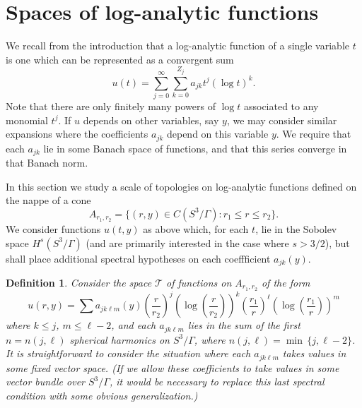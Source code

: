 \documentclass[12pt]{article}
\newtheorem{defn}[thm]{Definition}
\newcommand{\calT}{{\mathcal T}}
\begin{document}
\section{Spaces of log-analytic functions}
We recall from the introduction that a log-analytic function of a single variable $t$ is one which
can be represented as a convergent sum
\[
u(t) = \sum_{j=0}^\infty \sum_{k=0}^{Z_j} a_{jk} t^j (\log t)^k.
\]
Note that there are only finitely many powers of $\log t$ associated to any monomial $t^j$.  If $u$
depends on other variables, say $y$, we may consider similar expansions where the coefficients $a_{jk}$ 
depend on this variable $y$.  We require that each $a_{jk}$ lie in some Banach space of functions, and that
this series converge in that Banach norm. 

In this section we study a scale of topologies on log-analytic functions defined on the nappe of a cone
\[
A_{r_1, r_2} = \{ (r,y) \in C(S^3/\Gamma):  r_1 \leq r \leq r_2 \}.
\]
We consider functions $u(t,y)$ as above which, for each $t$, lie in the Sobolev space $H^s( S^3/\Gamma)$
(and are primarily interested in the case where $s > 3/2$), but shall place additional spectral hypotheses
on each coeffficient $a_{jk}(y)$.  

\begin{defn}
Consider the space $\calT$ of functions on $A_{r_1, r_2}$ of the form
\[
u(r,y) = \sum a_{j k \ell m}(y) \left( \frac{r}{r_2}\right)^j  \left(\log \left( \frac{r}{r_2}\right) \right)^k 
\left( \frac{r_1}{r} \right)^\ell \left( \log \left( \frac{r_1}{r} \right) \right)^m
\]
where $k \leq j$, $m \leq \ell-2$, and each $a_{jk \ell m}$ lies in the sum of the first $n = n(j,\ell)$ 
spherical harmonics on $S^3/\Gamma$, where $n(j,\ell) = \min \, \{ j, \ell-2\}$.   It is straightforward
to consider the situation where each $a_{j k \ell m}$ takes values in some fixed vector space.
(If we allow these coefficients to take values in some vector bundle over $S^3/\Gamma$, it would
be necessary to replace this last spectral condition with some obvious generalization.) 
\end{defn}



        
\end{document}

